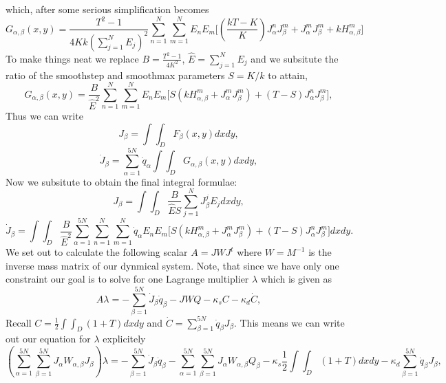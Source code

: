 which, after some serious simplification becomes
\begin{equation*}
    G_{\alpha, \beta}(x,y) = \frac{T^2-1}{4Kk \left(\sum_{j=1}^N E_j\right)^2} \sum_{n=1}^N \sum_{m=1}^N E_n E_m \bigg[ \left( \frac{kT-K}{K}\right) J_\alpha^n J_\beta^m +J_\alpha^m J_\beta^m +k H_{\alpha, \beta}^m \bigg]
\end{equation*}
To make things neat we replace $B = \frac{T^2-1}{4K^2}$, $\hat{E} = \sum_{j=1}^N E_j$ and we subsitute the ratio of the smoothstep and smoothmax parameters
$S = K/k$ to attain,
\begin{equation*}
    G_{\alpha, \beta}(x,y) = \frac{B}{\hat{E}^2} \sum_{n=1}^N \sum_{m=1}^N E_n E_m \bigg[   S(k H_{\alpha, \beta}^m +J_\alpha^m J_\beta^m )+ (T-S)J_\alpha^n J_\beta^m\bigg],
\end{equation*}
Thus we can write 
\begin{equation*}
    J_\beta =  \int \int_D F_{\beta}(x,y) dx dy,
\end{equation*}
\begin{equation*}
    \dot{J}_\beta =\sum_{\alpha=1}^{5N}\dot{q}_\alpha \int \int_D G_{\alpha, \beta}(x,y) dx dy,
\end{equation*}
Now we subsitute to obtain the final integral formulae:
\begin{equation*}
    J_\beta =  \int \int_D \frac{B}{\hat{E}S} \sum_{j=1}^N J_\beta^j E_j dx dy,
\end{equation*}
\begin{equation*}
    \dot{J}_\beta = \int \int_D \frac{B}{\hat{E}^2}  \sum_{\alpha=1}^{5N}  \sum_{n=1}^N \sum_{m=1}^N \dot{q}_\alpha E_n E_m \bigg[   S(k H_{\alpha, \beta}^m +J_\alpha^m J_\beta^m )+ (T-S)J_\alpha^n J_\beta^m\bigg] dx dy.
\end{equation*}
We set out to calculate the following scalar $A = JWJ^t$ where $W = M^{-1}$ is the inverse mass matrix of our dynmical system. Note, that since we have 
only one constraint our goal is to solve for one Lagrange multiplier $\lambda$ which is given as 
\begin{equation*}
A \lambda = - \sum_{\beta =1 }^{5N }\dot{J}_\beta \dot{q}_\beta - JWQ -\kappa_s C -\kappa_d \dot{C},
\end{equation*}
Recall $C = \frac{1}{2}\int \int_D (1+T) dx dy$ and $\dot{C} = \sum_{\beta=1}^{5N} \dot{q}_\beta J_\beta$. This means we can write out our equation for $\lambda$ explicitely
\begin{equation*}
    \left( \sum_{\alpha=1}^{5N} \sum_{\beta=1}^{5N} J_\alpha W_{\alpha, \beta} J_\beta \right) \lambda = - \sum_{\beta =1 }^{5N }\dot{J}_\beta \dot{q}_\beta - \sum_{\alpha =1}^{5N} \sum_{\beta =1}^{5N}J_\alpha W_{\alpha,\beta} Q_\beta -\kappa_s \frac{1}{2}\int \int_D (1+T) dx dy -\kappa_d \sum_{\beta=1}^{5N} \dot{q}_\beta J_\beta,
\end{equation*}
